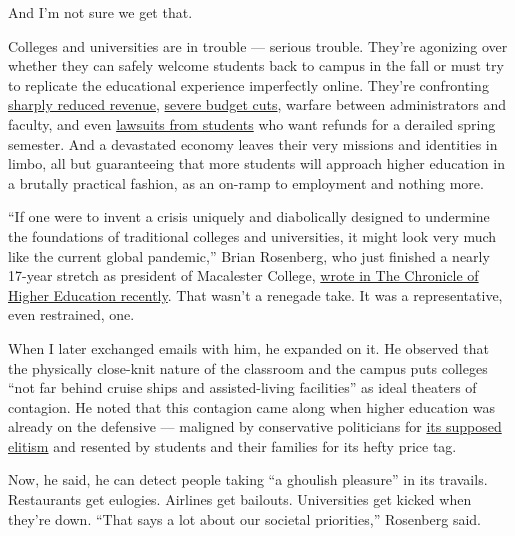And I'm not sure we get that.

Colleges and universities are in trouble --- serious trouble. They're
agonizing over whether they can safely welcome students back to campus
in the fall or must try to replicate the educational experience
imperfectly online. They're confronting
\href{https://abcnews.go.com/Business/coronavirus-pandemic-brings-staggering-losses-colleges-universities/story?id=70359686}{sharply
reduced revenue},
\href{https://www.wsj.com/articles/public-universities-see-state-funding-disappear-effective-immediately-11587653753?mod=article_inline}{severe
budget cuts}, warfare between administrators and faculty, and even
\href{https://www.nbcnews.com/news/us-news/students-25-universities-sue-refunds-after-campuses-close-due-coronavirus-n1200746}{lawsuits
from students} who want refunds for a derailed spring semester. And a
devastated economy leaves their very missions and identities in limbo,
all but guaranteeing that more students will approach higher education
in a brutally practical fashion, as an on-ramp to employment and nothing
more.

``If one were to invent a crisis uniquely and diabolically designed to
undermine the foundations of traditional colleges and universities, it
might look very much like the current global pandemic,'' Brian
Rosenberg, who just finished a nearly 17-year stretch as president of
Macalester College,
\href{https://www.chronicle.com/article/How-Should-Colleges-Prepare/248507}{wrote
in The Chronicle of Higher Education recently}. That wasn't a renegade
take. It was a representative, even restrained, one.

When I later exchanged emails with him, he expanded on it. He observed
that the physically close-knit nature of the classroom and the campus
puts colleges ``not far behind cruise ships and assisted-living
facilities'' as ideal theaters of contagion. He noted that this
contagion came along when higher education was already on the defensive
--- maligned by conservative politicians for
\href{https://www.washingtonpost.com/sf/national/2017/11/25/elitists-crybabies-and-junky-degrees/?utm_term=.032f27b188bc}{its
supposed elitism} and resented by students and their families for its
hefty price tag.

Now, he said, he can detect people taking ``a ghoulish pleasure'' in its
travails. Restaurants get eulogies. Airlines get bailouts. Universities
get kicked when they're down. ``That says a lot about our societal
priorities,'' Rosenberg said.

